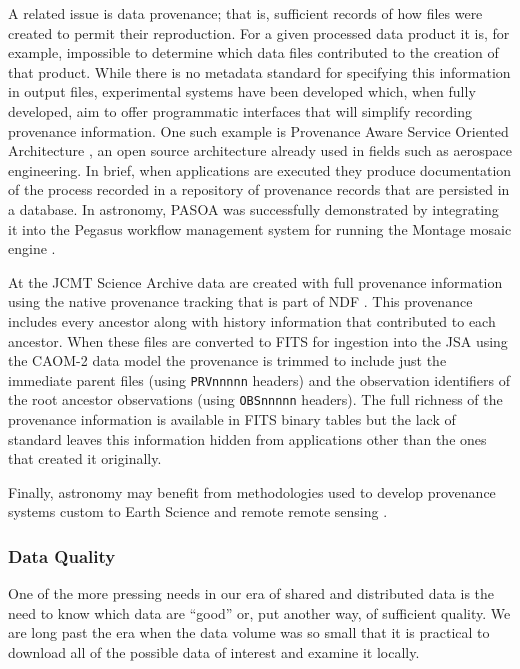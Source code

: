 \documentclass[final,authoryear,5p,times,twocolumn]{elsarticle}
\begin{document}
A related issue is data provenance; that is, sufficient records of how files
were created to permit their reproduction. For a given processed data product
it is, for example, impossible to determine which data files
contributed to the creation of that product. While there is no metadata standard
for specifying this
information in output files, experimental systems have been developed which, when fully developed,
aim to offer programmatic interfaces that will
simplify recording provenance information. One such example is
Provenance Aware Service Oriented Architecture
\citep[PASOA;][]{2008IPAWMoreau,2011743Moreau}, an open source architecture
already used in fields such as aerospace engineering. In brief, when
applications are executed they produce documentation of the process recorded
in a repository of provenance records that are persisted in a database. In
astronomy, PASOA was successfully demonstrated by integrating it into the
Pegasus workflow management system for running the Montage mosaic engine
\citep{2009SCGroth}.


At the JCMT Science Archive \citep[JSA;][]{2008ASPC..394..135G} data are
created with full provenance information using the native provenance
tracking that is part of NDF \citep{2009ASPC..411..418J}. This
provenance includes every ancestor along with history information that
contributed to each ancestor. When these files are converted to FITS
for ingestion into the JSA using the CAOM-2 data model
\citep{2013ASPC..475..159R} the provenance is trimmed to include
just the immediate parent files (using \texttt{PRVnnnnn} headers)
and the observation identifiers of the root ancestor observations
(using \texttt{OBSnnnnn} headers). The full richness of the provenance
information is available in FITS binary tables but the lack of standard
leaves this information hidden from applications other than the ones
that created it originally.

Finally, astronomy may benefit from methodologies used to develop provenance
systems custom to Earth Science and remote remote sensing
\citep{2008IPAWTilmes,2008IPAWMcCann}.


\subsubsection{Data Quality}


One of the more pressing needs in our era of shared and distributed
data is the need to know which data are ``good'' or, put another way, of
sufficient quality. We are long past the era when the data volume was
so small that it is practical to download all of the possible data of
interest and examine it locally.
\end{document}
